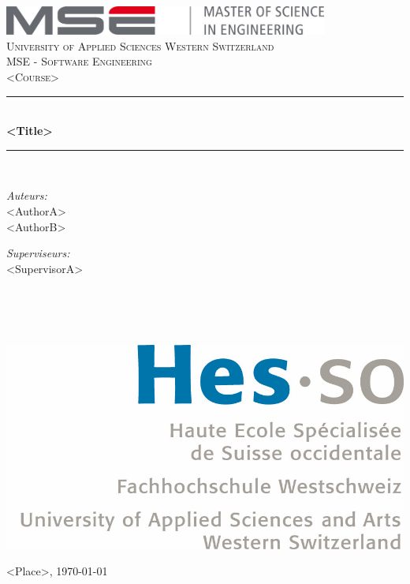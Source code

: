 \documentclass[a4paper,11pt]{report}
\newcommand{\Ecole}{University of Applied Sciences Western Switzerland}
\newcommand{\Filiere}{MSE - Software Engineering}
\newcommand{\Cours}{<Course>}
\newcommand{\Titre}{<Title>}
\newcommand{\Lieu}{<Place>}
\newcommand{\ReferentA}{<SupervisorA>}
\newcommand{\PartA}{<AuthorA>}
\newcommand{\PartB}{<AuthorB>}
\newcommand{\Parts}{\PartA \\ \PartB}
\newcommand{\Referents}{\ReferentA \\ \ReferentB \\ \ReferentC \\ \ReferentD}
\newcommand{\HRule}{\rule{\linewidth}{0.5mm}}
\begin{document}
\begin{titlepage}
    \begin{center}

        \includegraphics[width=0.8\textwidth]{img/mse_logo}~\\[1.5cm]
        \textsc{\Large \Ecole}\\[0.25cm]
        \textsc{\large \Filiere}\\[1.5cm]
        \textsc{\Large \Cours}\\[0.5cm]

        \HRule \\[0.4cm]
        { \huge \bfseries \Titre\\[0.4cm] }
        \HRule \\[1.5cm]

        \begin{minipage}[t]{0.4\textwidth}
            \begin{flushleft} \large
                \emph{Auteurs:}\\ \Parts
            \end{flushleft}
        \end{minipage}
        \begin{minipage}[t]{0.4\textwidth}
            \begin{flushright} \large
                \emph{Superviseurs:}\\\Referents
            \end{flushright}
        \end{minipage}~\\[1.5cm]

        \begin{center}
            \includegraphics[scale=0.7]{img/logo_hes-so}
        \end{center}

        \vfill

        {\large \Lieu, \today}

    \end{center}
\end{titlepage}
\end{document}
